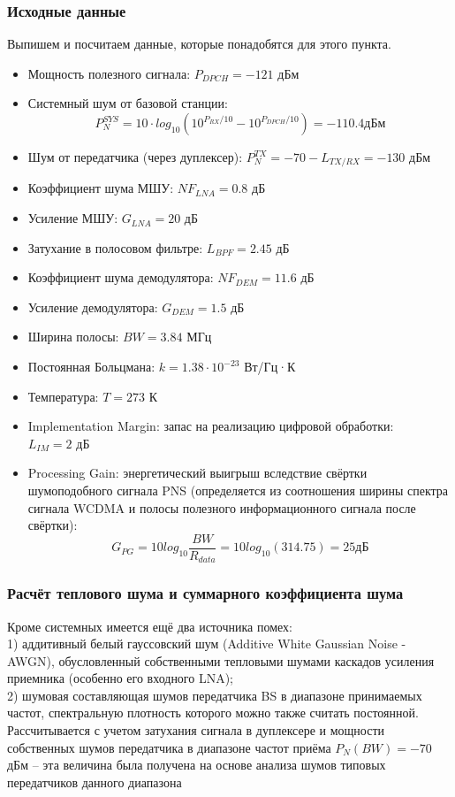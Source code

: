\documentclass[a4paper,12pt]{article}
\begin{document}
\subsubsection{Исходные данные}
Выпишем и посчитаем данные, которые понадобятся для этого пункта.
\begin{itemize}
\item Мощность полезного сигнала: $P_{DPCH} = -121$ дБм
\item Системный шум от базовой станции:
\begin{equation}
P_{N}^{SYS} = 10 · log_{10}(10^{P_{RX}/10} - 10^{P_{DPCH}/10})= -110.4 \text{дБм}
\end{equation}
\item Шум от передатчика (через дуплексер): $P_{N}^{TX} = -70 - L_{TX/RX} = -130$ дБм
\item Коэффициент шума МШУ: $NF_{LNA} = 0.8$ дБ
\item Усиление МШУ: $G_{LNA} = 20$ дБ
\item Затухание в полосовом фильтре: $L_{BPF} = 2.45$ дБ
\item Коэффициент шума демодулятора: $NF_{DEM} = 11.6$ дБ
\item Усиление демодулятора: $G_{DEM} = 1.5$ дБ
\item Ширина полосы: $BW = 3.84$ МГц 
\item Постоянная Больцмана: $k = 1.38\cdot10^{-23}$ Вт/Гц·К
\item Температура: $T = 273$ К 
\item Implementation Margin: запас на реализацию цифровой обработки:\\ $L_{IM} = 2$ дБ
\item Processing Gain: энергетический выигрыш вследствие свёртки шумоподобного сигнала PNS (определяется из соотношения ширины спектра сигнала WCDMA и полосы полезного информационного сигнала после свёртки): 
\begin{equation}
G_{PG} = 10  log_{10}\frac{BW}{R_{data}} = 10log_{10}(314.75) = 25 \text{дБ}
\end{equation}
\end{itemize}
\subsubsection{Расчёт теплового шума и суммарного коэффициента шума}
Кроме системных имеется ещё два источника помех:  \\
1) аддитивный белый гауссовский шум (Additive White Gaussian Noise - AWGN), обусловленный собственными тепловыми шумами каскадов усиления приемника (особенно его входного LNA);\\
2) шумовая составляющая шумов передатчика BS в диапазоне принимаемых частот, спектральную плотность которого можно также считать постоянной. Рассчитывается с учетом затухания сигнала в дуплексере и мощности собственных шумов передатчика в диапазоне частот приёма $P_N(BW) = -70$ дБм -- эта величина была получена на основе анализа шумов типовых передатчиков данного диапазона\\
\end{document}
